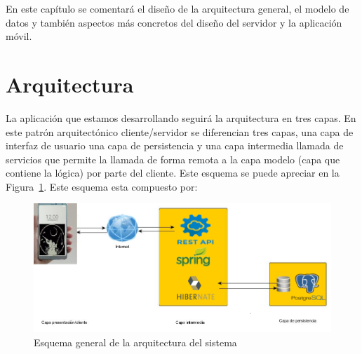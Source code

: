 

En este capítulo se comentará el diseño de la arquitectura general, el
modelo de datos y también aspectos más concretos del diseño del servidor y la aplicación
móvil.



\section{Arquitectura}
La aplicación que estamos desarrollando seguirá la arquitectura
en tres capas. En este patrón arquitectónico cliente/servidor se diferencian tres
capas, una capa de interfaz de usuario una capa de persistencia
y una capa intermedia llamada de servicios que permite la llamada de forma remota a la capa modelo (capa que contiene la lógica) por parte del cliente. Este esquema se puede apreciar en la Figura~\ref{fig:arquitectura2}. Este esquema esta compuesto por:




\begin{figure}
		\centering
		\includegraphics[width=\textwidth] {arquitectura2.png}
		\caption{Esquema general de la arquitectura del sistema }\label{fig:arquitectura2}
	\end{figure}


